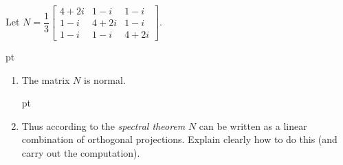 \begin{exer} Let $N = \dfrac13\begin{bmatrix}
                                4+2i & 1-i  & 1-i  \\
                                1-i  & 4+2i & 1-i  \\
                                1-i  & 1-i  & 4+2i \end{bmatrix}$.

 pt
 \begin{enumerate}
  \item The matrix $N$ is normal.

 pt

  \item Thus according to the \emph{spectral theorem} $N$
can be written as a linear combination of orthogonal projections.
Explain clearly how to do this (and carry out the computation).
 \end{enumerate}
\end{exer}














\endinput
